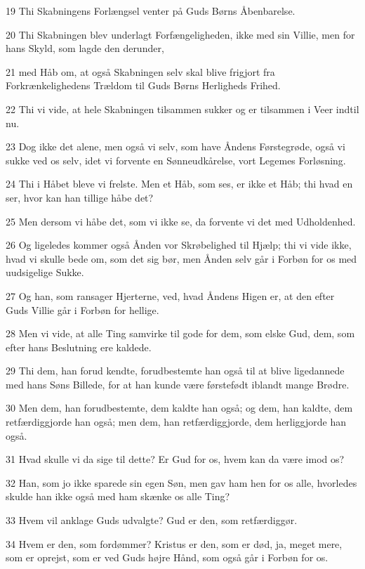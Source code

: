 \par 19 Thi Skabningens Forlængsel venter på Guds Børns Åbenbarelse.
\par 20 Thi Skabningen blev underlagt Forfængeligheden, ikke med sin Villie, men for hans Skyld, som lagde den derunder,
\par 21 med Håb om, at også Skabningen selv skal blive frigjort fra Forkrænkelighedens Trældom til Guds Børns Herligheds Frihed.
\par 22 Thi vi vide, at hele Skabningen tilsammen sukker og er tilsammen i Veer indtil nu.
\par 23 Dog ikke det alene, men også vi selv, som have Åndens Førstegrøde, også vi sukke ved os selv, idet vi forvente en Sønneudkårelse, vort Legemes Forløsning.
\par 24 Thi i Håbet bleve vi frelste. Men et Håb, som ses, er ikke et Håb; thi hvad en ser, hvor kan han tillige håbe det?
\par 25 Men dersom vi håbe det, som vi ikke se, da forvente vi det med Udholdenhed.
\par 26 Og ligeledes kommer også Ånden vor Skrøbelighed til Hjælp; thi vi vide ikke, hvad vi skulle bede om, som det sig bør, men Ånden selv går i Forbøn for os med uudsigelige Sukke.
\par 27 Og han, som ransager Hjerterne, ved, hvad Åndens Higen er, at den efter Guds Villie går i Forbøn for hellige.
\par 28 Men vi vide, at alle Ting samvirke til gode for dem, som elske Gud, dem, som efter hans Beslutning ere kaldede.
\par 29 Thi dem, han forud kendte, forudbestemte han også til at blive ligedannede med hans Søns Billede, for at han kunde være førstefødt iblandt mange Brødre.
\par 30 Men dem, han forudbestemte, dem kaldte han også; og dem, han kaldte, dem retfærdiggjorde han også; men dem, han retfærdiggjorde, dem herliggjorde han også.
\par 31 Hvad skulle vi da sige til dette? Er Gud for os, hvem kan da være imod os?
\par 32 Han, som jo ikke sparede sin egen Søn, men gav ham hen for os alle, hvorledes skulde han ikke også med ham skænke os alle Ting?
\par 33 Hvem vil anklage Guds udvalgte? Gud er den, som retfærdiggør.
\par 34 Hvem er den, som fordømmer? Kristus er den, som er død, ja, meget mere, som er oprejst, som er ved Guds højre Hånd, som også går i Forbøn for os.
